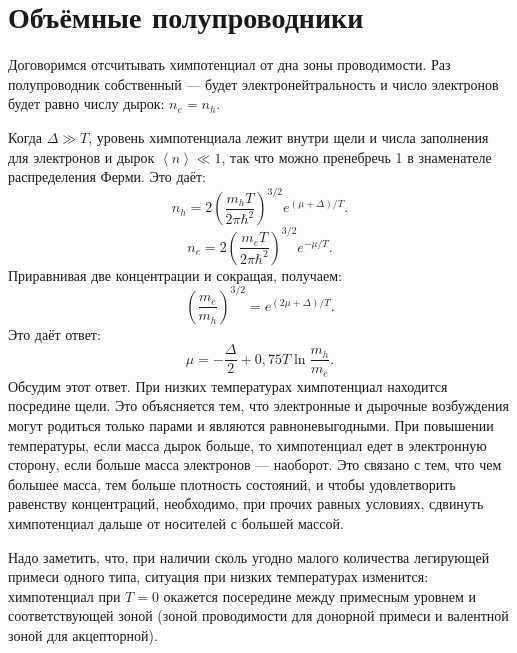 \documentclass[a4paper]{article}
\begin{document}
\section{Объёмные полупроводники}
\begin{hiProb}[4.7]
\end{hiProb}
\begin{sol}
Договоримся отсчитывать химпотенциал от дна зоны
проводимости. Раз полупроводник собственный ---
будет электронейтральность и число электронов
будет равно числу дырок: $n_e=n_h$.

Когда  $\Delta \gg T$, уровень химпотенциала
лежит внутри щели и числа заполнения для
электронов и дырок $\left<n \right> \ll 1$, так
что можно пренебречь 1 в знаменателе распределения
Ферми. Это даёт:
\[
	n_h= 2 \left( \frac{m_h T}{2\pi \hbar ^2} \right) ^{3 /2} e^{(\mu +\Delta) /T}
.\] 
\[
	n_e =2 \left( \frac{m_e T}{2\pi \hbar ^2} \right) ^{3/2} e^{-\mu /T}
.\] 
Приравнивая две концентрации и сокращая, получаем:
\[
	\left( \frac{m_e}{m_h} \right) ^{3/2}
	=e^{(2\mu +\Delta) /T}
.\] 
Это даёт ответ:
\[
\mu=-\frac{\Delta}{2} +0,75 T \ln \frac{m_h}{m_e}
.\] 
Обсудим этот ответ. При низких температурах химпотенциал находится посредине щели. Это объясняется тем,
что электронные и дырочные возбуждения могут родиться
только парами и являются равноневыгодными. При
повышении температуры, если масса дырок больше,
то химпотенциал едет в электронную сторону,
если больше масса электронов --- наоборот. Это
связано с тем, что чем большее масса, тем больше
плотность состояний, и чтобы удовлетворить
равенству концентраций, необходимо, при прочих
равных условиях, сдвинуть химпотенциал дальше
от носителей с большей массой.

Надо заметить, что, при наличии сколь угодно
малого количества легирующей примеси
одного типа, ситуация при низких температурах изменится: химпотенциал при $T=0$ окажется посередине
между примесным уровнем и соответствующей зоной
(зоной проводимости для донорной примеси и валентной
зоной для акцепторной).
\end{sol}
\begin{hiProb}[Т6-1]
\end{hiProb}
\end{document}
